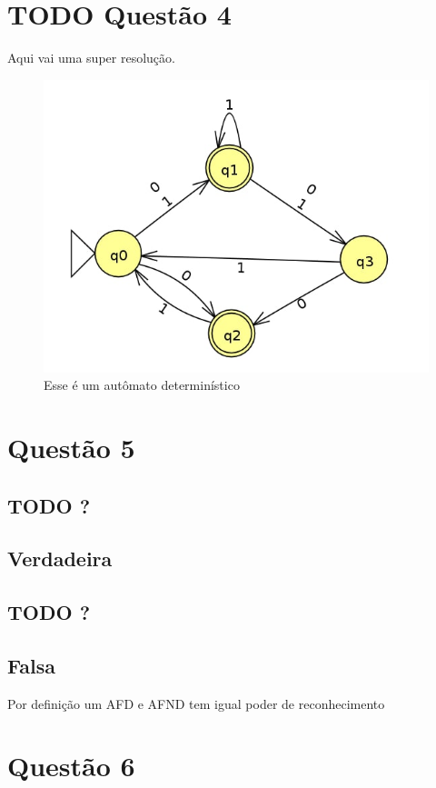 \documentclass[11pt]{article}
\begin{document}
\section{{\bfseries\sffamily TODO} Questão 4}
\label{sec:org1a61117}
Aqui vai uma super resolução.
\begin{figure}[htbp]
\centering
\includegraphics[width=.9\linewidth]{./q4/q4.jpg}
\caption{\label{fig:orgf72c534}
Esse é um autômato determinístico}
\end{figure}
\section{Questão 5}
\label{sec:org06bdf08}

\subsection{{\bfseries\sffamily TODO} ?}
\label{sec:org9fb4016}
\subsection{Verdadeira}
\label{sec:orgc3f4e6d}
\subsection{{\bfseries\sffamily TODO} ?}
\label{sec:org8ca3409}
\subsection{Falsa}
\label{sec:orgee62359}
Por definição um AFD e AFND tem igual poder de reconhecimento

\section{Questão 6}
\label{sec:orgdc50052}
\end{document}
